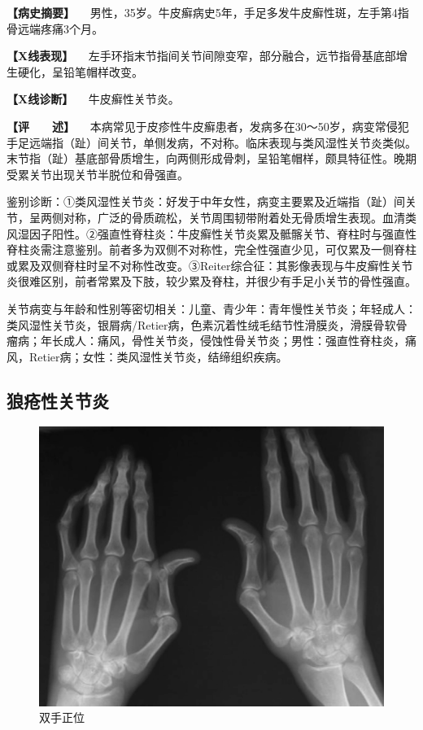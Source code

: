 \textbf{【病史摘要】}
　男性，35岁。牛皮癣病史5年，手足多发牛皮癣性斑，左手第4指骨远端疼痛3个月。

\textbf{【X线表现】}
　左手环指末节指间关节间隙变窄，部分融合，远节指骨基底部增生硬化，呈铅笔帽样改变。

\textbf{【X线诊断】} 　牛皮癣性关节炎。

\textbf{【评　　述】}
　本病常见于皮疹性牛皮癣患者，发病多在30～50岁，病变常侵犯手足远端指（趾）间关节，单侧发病，不对称。临床表现与类风湿性关节炎类似。末节指（趾）基底部骨质增生，向两侧形成骨刺，呈铅笔帽样，颇具特征性。晚期受累关节出现关节半脱位和骨强直。

鉴别诊断：①类风湿性关节炎：好发于中年女性，病变主要累及近端指（趾）间关节，呈两侧对称，广泛的骨质疏松，关节周围韧带附着处无骨质增生表现。血清类风湿因子阳性。②强直性脊柱炎：牛皮癣性关节炎累及骶髂关节、脊柱时与强直性脊柱炎需注意鉴别。前者多为双侧不对称性，完全性强直少见，可仅累及一侧脊柱或累及双侧脊柱时呈不对称性改变。③Reiter综合征：其影像表现与牛皮癣性关节炎很难区别，前者常累及下肢，较少累及脊柱，并很少有手足小关节的骨性强直。

关节病变与年龄和性别等密切相关：儿童、青少年：青年慢性关节炎；年轻成人：类风湿性关节炎，银屑病/Retier病，色素沉着性绒毛结节性滑膜炎，滑膜骨软骨瘤病；年长成人：痛风，骨性关节炎，侵蚀性骨关节炎；男性：强直性脊柱炎，痛风，Retier病；女性：类风湿性关节炎，结缔组织疾病。

\subsection{狼疮性关节炎}

\begin{figure}[!htbp]
 \centering
 \includegraphics{./images/Image00119.jpg}
 \captionsetup{justification=centering}
 \caption{双手正位}
 \label{fig2-8-5}
  \end{figure} 

